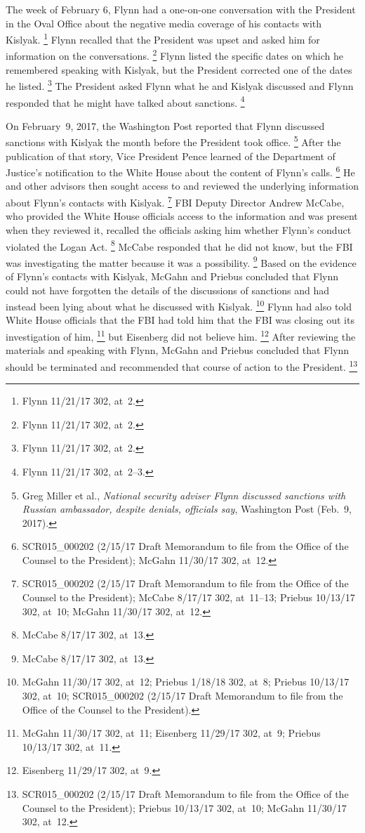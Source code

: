 The week of February 6, Flynn had a one-on-one conversation with the President in the Oval Office about the negative media coverage of his contacts with Kislyak.%
\footnote{Flynn 11/21/17 302, at~2.}
Flynn recalled that the President was upset and asked him for information on the conversations.%
\footnote{Flynn 11/21/17 302, at~2.}
Flynn listed the specific dates on which he remembered speaking with Kislyak, but the President corrected one of the dates he listed.%
\footnote{Flynn 11/21/17 302, at~2.}
The President asked Flynn what he and Kislyak discussed and Flynn responded that he might have talked about sanctions.%
\footnote{Flynn 11/21/17 302, at~2--3.}

On February~9, 2017, the Washington Post reported that Flynn discussed sanctions with Kislyak the month before the President took office.%
\footnote{Greg Miller et al., \textit{National security adviser Flynn discussed sanctions with Russian ambassador, despite denials, officials say}, Washington Post (Feb.~9, 2017).}
After the publication of that story, Vice President Pence learned of the Department of Justice's notification to the White House about the content of Flynn's calls.%
\footnote{SCR015\_000202 (2/15/17 Draft Memorandum to file from the Office of the Counsel to the President); McGahn 11/30/17 302, at~12.}
He and other advisors then sought access to and reviewed the underlying information about Flynn's contacts with Kislyak.%
\footnote{SCR015\_000202 (2/15/17 Draft Memorandum to file from the Office of the Counsel to the President);
McCabe 8/17/17 302, at~11--13;
Priebus 10/13/17 302, at~10;
McGahn 11/30/17 302, at~12.}
FBI Deputy Director Andrew McCabe, who provided the White House officials access to the information and was present when they reviewed it, recalled the officials asking him whether Flynn's conduct violated the Logan Act.%
\footnote{McCabe 8/17/17 302, at~13.}
McCabe responded that he did not know, but the FBI was investigating the matter because it was a possibility.%
\footnote{McCabe 8/17/17 302, at~13.}
Based on the evidence of Flynn's contacts with Kislyak, McGahn and Priebus concluded that Flynn could not have forgotten the details of the discussions of sanctions and had instead been lying about what he discussed with Kislyak.%
\footnote{McGahn 11/30/17 302, at~12;
Priebus 1/18/18 302, at~8;
Priebus 10/13/17 302, at~10;
SCR015\_000202 (2/15/17 Draft Memorandum to file from the Office of the Counsel to the President).}
Flynn had also told White House officials that the FBI had told him that the FBI was closing out its investigation of him,%
\footnote{McGahn 11/30/17 302, at~11;
Eisenberg 11/29/17 302, at~9;
Priebus 10/13/17 302, at~11.}
but Eisenberg did not believe him.%
\footnote{Eisenberg 11/29/17 302, at~9.}
After reviewing the materials and speaking with Flynn, McGahn and Priebus concluded that Flynn should be terminated and recommended that course of action to the President.%
\footnote{SCR015\_000202 (2/15/17 Draft Memorandum to file from the Office of the Counsel to the President);
Priebus 10/13/17 302, at~10;
McGahn 11/30/17 302, at~12.}

